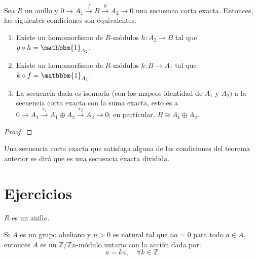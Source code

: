 \documentclass[12pt]{report}
\newcounter{it}
\theoremstyle{largebreak}
\newcommand\cf[3]{\ensuremath{#1:#2\rightarrow#3}}
\newcommand{\bbm}[1]{\mathbbm{#1}}
\begin{document}
    \begin{theor}
        Sea $R$ un anillo y $0\rightarrow A_1\overset{f}{\rightarrow}B\overset{g}{\rightarrow}A_2\rightarrow0$ una secuencia corta exacta. Entonces, las siguientes condiciones son equivalentes:
        \begin{enumerate}[label = \textit{(\arabic*)}]
            \item Existe un homomorfismo de $R$-módulos $\cf{h}{A_2}{B}$ tal que $g\circ h=\bbm{1}_{ A_2}$.
            \item Existe un homomorfismo de $R$-módulos $\cf{k}{B}{A_1}$ tal que $k\circ f=\bbm{1}_{ A_1}$.
            \item La secuencia dada es isomorfa (con los mapeos identidad de $A_1$ y $A_2$) a la secuencia corta exacta con la suma exacta, esto es a $0\rightarrow A_1\overset{\iota_1}{\rightarrow}A_1\oplus A_2 \overset{\pi_2}{\rightarrow}A_2\rightarrow0$; en particular, $B\cong A_1\oplus A_2$.
        \end{enumerate}
    \end{theor}

    \begin{proof}
        
    \end{proof}

    \begin{mydef}
        Una secuencia corta exacta que satisfaga alguna de las condiciones del teorema anterior se dirá que es una secuencia exacta dividida.
    \end{mydef}

    \newpage

    \section{Ejercicios}

    \begin{obs}
        $R$ es un anillo.
    \end{obs}

    \begin{excer}
        Si $A$ es un grupo abeliano y $n>0$ es natural tal que $na=0$ para todo $a\in A$, entonces $A$ es un $\mathbb{Z}/\mathbb{Z}n$-módulo untario con la acción dada por:
        \begin{equation*}
            [k]a=ka,\quad\forall k\in\mathbb{Z}
        \end{equation*}
    \end{excer}
\end{document}
